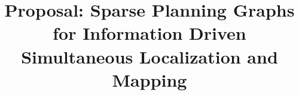 \documentclass[]{article}
\begin{document}
\title{Proposal: Sparse Planning Graphs for Information Driven Simultaneous Localization and Mapping}

\maketitle






\end{document}
